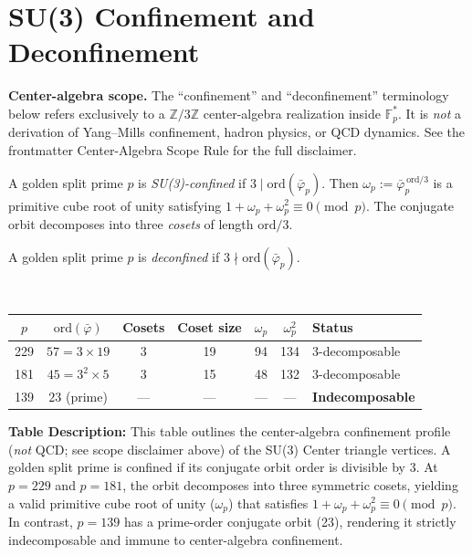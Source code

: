 \section{SU(3) Confinement and Deconfinement}
\label{sec:confinement}

\textbf{Center-algebra scope.} The ``confinement'' and ``deconfinement'' terminology below refers exclusively to a $\mathbb{Z}/3\mathbb{Z}$ center-algebra realization inside $\mathbb{F}_p^*$. It is \emph{not} a derivation of Yang--Mills confinement, hadron physics, or QCD dynamics. See the frontmatter Center-Algebra Scope Rule for the full disclaimer.

\begin{definition}[SU(3) confinement]
A golden split prime $p$ is \emph{SU(3)-confined} if
$3 \mid \mathrm{ord}(\bar\varphi_p)$.
Then $\omega_p := \bar\varphi_p^{\,\mathrm{ord}/3}$
is a primitive cube root of unity satisfying
$1 + \omega_p + \omega_p^2 \equiv 0 \pmod{p}$.
The conjugate orbit decomposes into three \emph{cosets}
of length $\mathrm{ord}/3$.
\end{definition}

\begin{definition}[Deconfinement]
A golden split prime $p$ is \emph{deconfined} if
$3 \nmid \mathrm{ord}(\bar\varphi_p)$.
\end{definition}

\begin{result}
\label{res:confinement}
~
\begin{center}
\begin{tabular}{@{}ccccccl@{}}
\toprule
$p$ & $\mathrm{ord}(\bar\varphi)$ & Cosets & Coset size
    & $\omega_p$ & $\omega_p^2$ & Status \\
\midrule
229 & $57 = 3 \times 19$ & 3 & 19 & 94 & 134 & 3-decomposable \\
181 & $45 = 3^2 \times 5$ & 3 & 15 & 48 & 132 & 3-decomposable \\
139 & $23$ (prime) & --- & --- & --- & --- & \textbf{Indecomposable} \\
\bottomrule
\end{tabular}
\end{center}
\textbf{Table Description:} This table outlines the center-algebra confinement profile (\emph{not} QCD; see scope disclaimer above) of the SU(3) Center triangle vertices. A golden split prime is confined if its conjugate orbit order is divisible by 3. At $p=229$ and $p=181$, the orbit decomposes into three symmetric cosets, yielding a valid primitive cube root of unity ($\omega_p$) that satisfies $1 + \omega_p + \omega_p^2 \equiv 0 \pmod{p}$. In contrast, $p=139$ has a prime-order conjugate orbit (23), rendering it strictly indecomposable and immune to center-algebra confinement.
\end{result}

